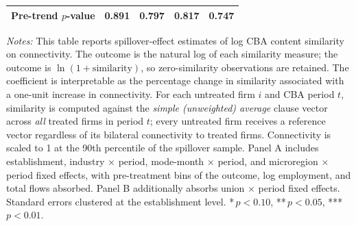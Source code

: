 \begin{table}[H]
\begin{tabular}{lcccc}
Pre-trend $p$-value & 0.891 & 0.797 & 0.817 & 0.747 \\
\hline\hline
\end{tabular}
\begin{minipage}{\linewidth}
\smallskip
\scriptsize\textit{Notes:} This table reports spillover-effect estimates of log CBA content similarity on connectivity. The outcome is the natural log of each similarity measure; the outcome is $\ln(1+\text{similarity})$, so zero-similarity observations are retained. The coefficient is interpretable as the percentage change in similarity associated with a one-unit increase in connectivity. For each untreated firm $i$ and CBA period $t$, similarity is computed against the \emph{simple (unweighted) average} clause vector across \emph{all} treated firms in period $t$; every untreated firm receives a reference vector regardless of its bilateral connectivity to treated firms. Connectivity is scaled to 1 at the 90th percentile of the spillover sample. Panel A includes establishment, industry $\times$ period, mode-month $\times$ period, and microregion $\times$ period fixed effects, with pre-treatment bins of the outcome, log employment, and total flows absorbed. Panel B additionally absorbs union $\times$ period fixed effects. Standard errors clustered at the establishment level. *\,$p<0.10$, **\,$p<0.05$, ***\,$p<0.01$.
\end{minipage}
\end{table}
